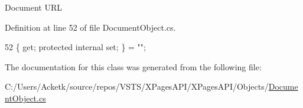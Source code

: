 Document U\+RL 



Definition at line 52 of file Document\+Object.\+cs.


\begin{DoxyCode}
52 \{ \textcolor{keyword}{get}; \textcolor{keyword}{protected} \textcolor{keyword}{internal} \textcolor{keyword}{set}; \} = \textcolor{stringliteral}{""};
\end{DoxyCode}


The documentation for this class was generated from the following file\+:\begin{DoxyCompactItemize}
\item 
C\+:/\+Users/\+Acketk/source/repos/\+V\+S\+T\+S/\+X\+Pages\+A\+P\+I/\+X\+Pages\+A\+P\+I/\+Objects/\mbox{\hyperlink{_document_object_8cs}{Document\+Object.\+cs}}\end{DoxyCompactItemize}
